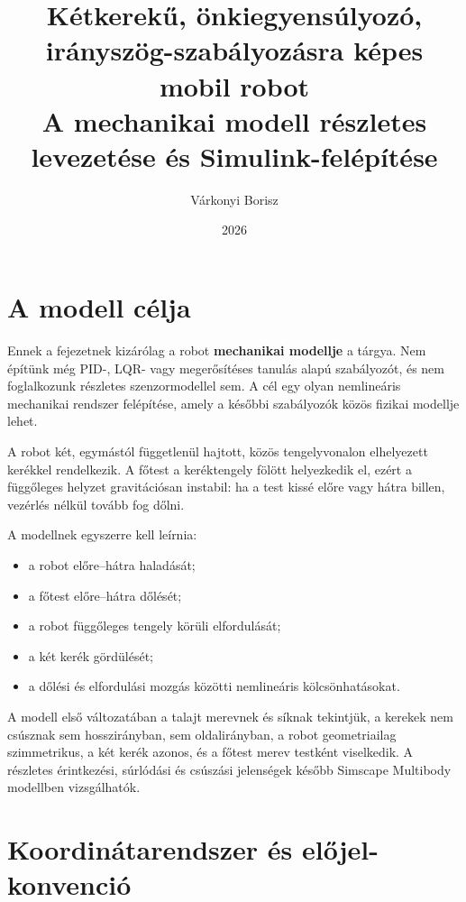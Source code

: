 \documentclass[12pt,a4paper]{article}
\title{Kétkerekű, önkiegyensúlyozó, irányszög-szabályozásra képes mobil robot\\
	\large A mechanikai modell részletes levezetése és Simulink-felépítése}
\author{Várkonyi Borisz}
\date{2026}
\begin{document}
	
	\maketitle
	\tableofcontents
	\newpage
	
	\section{A modell célja}
	
	Ennek a fejezetnek kizárólag a robot \textbf{mechanikai modellje} a tárgya. Nem építünk még PID-, LQR- vagy megerősítéses tanulás alapú szabályozót, és nem foglalkozunk részletes szenzormodellel sem. A cél egy olyan nemlineáris mechanikai rendszer felépítése, amely a későbbi szabályozók közös fizikai modellje lehet.
	
	A robot két, egymástól függetlenül hajtott, közös tengelyvonalon elhelyezett kerékkel rendelkezik. A főtest a keréktengely fölött helyezkedik el, ezért a függőleges helyzet gravitációsan instabil: ha a test kissé előre vagy hátra billen, vezérlés nélkül tovább fog dőlni.
	
	A modellnek egyszerre kell leírnia:
	\begin{itemize}[leftmargin=2em]
		\item a robot előre--hátra haladását;
		\item a főtest előre--hátra dőlését;
		\item a robot függőleges tengely körüli elfordulását;
		\item a két kerék gördülését;
		\item a dőlési és elfordulási mozgás közötti nemlineáris kölcsönhatásokat.
	\end{itemize}
	
	A modell első változatában a talajt merevnek és síknak tekintjük, a kerekek nem csúsznak sem hosszirányban, sem oldalirányban, a robot geometriailag szimmetrikus, a két kerék azonos, és a főtest merev testként viselkedik. A részletes érintkezési, súrlódási és csúszási jelenségek később Simscape Multibody modellben vizsgálhatók.
	
	\section{Koordinátarendszer és előjel-konvenció}
	
\end{document}

